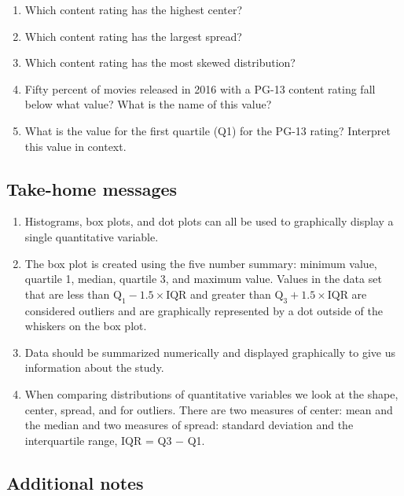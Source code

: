\documentclass[
]{report}
\begin{document}
\begin{enumerate}
\def\labelenumi{\alph{enumi}.}
\item
  Which content rating has the highest center?
  \vspace{0.2in}
\item
  Which content rating has the largest spread?
  \vspace{0.2in}
\item
  Which content rating has the most skewed distribution?
  \vspace{0.2in}
\item
  Fifty percent of movies released in 2016 with a PG-13 content rating fall below what value? What is the name of this value?
  \vspace{0.4in}
\item
  What is the value for the first quartile (Q1) for the PG-13 rating? Interpret this value in context.
  \vspace{.8in}
\end{enumerate}

\hypertarget{take-home-messages-5}{%
\subsection{Take-home messages}\label{take-home-messages-5}}

\begin{enumerate}
\def\labelenumi{\arabic{enumi}.}
\item
  Histograms, box plots, and dot plots can all be used to graphically display a single quantitative variable.
\item
  The box plot is created using the five number summary: minimum value, quartile 1, median, quartile 3, and maximum value. Values in the data set that are less than \(\text{Q}_1 - 1.5\times \text{IQR}\) and greater than \(\text{Q}_3 + 1.5\times \text{IQR}\) are considered outliers and are graphically represented by a dot outside of the whiskers on the box plot.
\item
  Data should be summarized numerically and displayed graphically to give us information about the study.
\item
  When comparing distributions of quantitative variables we look at the shape, center, spread, and for outliers. There are two measures of center: mean and the median and two measures of spread: standard deviation and the interquartile range, IQR = Q3 \(-\) Q1.
\end{enumerate}

\hypertarget{additional-notes-5}{%
\subsection{Additional notes}\label{additional-notes-5}}
\end{document}
